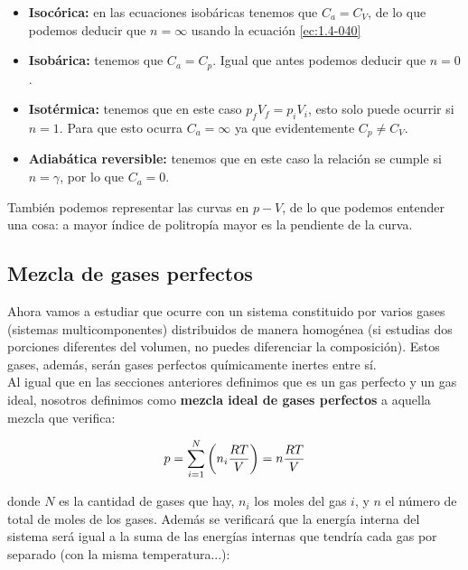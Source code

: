 \documentclass[12pt,a4paper]{article}
\begin{document}
\begin{itemize}
\item \textbf{Isocórica:} en las ecuaciones isobáricas tenemos que $C_a = C_V$, de lo que podemos deducir que $n=\infty$ usando la ecuación \ref{ec:1.4-040}

\item  \textbf{Isobárica:}  tenemos que $C_a = C_p$. Igual que antes podemos deducir que $n = 0$.

\item \textbf{Isotérmica:} tenemos que en este caso $p_f V_f = p_i V_i$, esto solo puede ocurrir si $n = 1$. Para que esto ocurra $C_a = \infty$ ya que evidentemente $C_p \neq C_V$. 

\item \textbf{Adiabática reversible:} tenemos que en este caso la relación se cumple si $n = \gamma$, por lo que $C_a = 0$.  

\end{itemize}


También podemos representar las curvas en $p-V$, de lo que podemos entender una cosa: a mayor índice de politropía mayor es la pendiente de la curva. 


\subsection{Mezcla de gases perfectos} 

Ahora vamos a estudiar que ocurre con un sistema constituido por varios gases (sistemas multicomponentes) distribuidos de manera homogénea (si estudias dos porciones diferentes del volumen, no puedes diferenciar la composición). Estos gases, además, serán gases perfectos químicamente inertes entre sí. \\

Al igual que en las secciones anteriores definimos que es un gas perfecto y un gas ideal, nosotros definimos como \textbf{mezcla ideal de gases perfectos} a aquella mezcla que verifica:

\begin{equation}
p = \sum_{i=1}^N \left( n_i \dfrac{RT}{V} \right) = n \dfrac{RT}{V}
\label{ec:1.5-046}
\end{equation}

donde $N$ es la cantidad de gases que hay, $n_i$ los moles del gas $i$, y $n$ el número de total de moles de los gases. Además se verificará que la energía interna del sistema será igual a la suma de las energías internas que tendría cada gas por separado (con la misma temperatura...):
\end{document}
